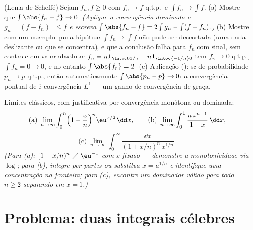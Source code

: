 \begin{exercise}[$\star\star$]\label{exo:b3:lebesgue:11}
(Lema de Scheffé) Sejam $f_n, f \geq 0$  com $f_n \to f$ q.t.p.\ e $\int f_n \to \int f$.
(a) Mostre que $\int\abs{f_n - f} \to 0$. \emph{(Aplique a convergência dominada a $g_n = (f - f_n)^+ \leq f$ e
escreva $\int\abs{f_n - f} = 2\int g_n - \int(f - f_n)$.)}
(b) Mostre com um exemplo que a hipótese $\int f_n \to \int
f$ não pode ser descartada
(uma onda deslizante ou que se concentra), e que a conclusão falha para
$f_n$ com sinal, sem controle em valor absoluto: $f_n = n\mathbf 1_{\intoc0{1/n}} -
n\mathbf 1_{\intoc{-1/n}0}$ tem $f_n \to 0$
q.t.p., $\int f_n
= 0 \to 0$, e no entanto $\int\abs{f_n} = 2$.
(c) Aplicação (): se  de probabilidade $p_n
\to p$
q.t.p., então automaticamente $\int\abs{p_n - p} \to 0$: a convergência pontual de
 é convergência $L^1$ --- um ganho de convergência de
graça.
\end{exercise}

\begin{exercise}[$\star\star$]\label{exo:b3:lebesgue:12}
Limites clássicos, com justificativa  por convergência monótona
ou dominada:
\[
\text{(a)}\ \lim_{n\to\infty}\int_0^n\Bigl(1 -
\frac xn\Bigr)^n\eu^{x/2}\,\dd x, \qquad
\text{(b)}\ \lim_{n\to\infty}\int_0^1\frac{n\,x^{n-1}}{1 +
x}\,\dd x,
\]
\[
\text{(c)}\ \lim_{n\to\infty}\int_0^\infty
\frac{\dd x}{(1 + x/n)^n\,x^{1/n}} .
\]
\emph{(Para (a): $(1 - x/n)^n \nearrow \eu^{-x}$ com $x$ fixado --- demonstre a monotonicidade
via $\log$; para (b), integre por partes ou substitua $x = u^{1/n}$ e
identifique uma concentração na fronteira; para (c), encontre um
dominador  válido para todo $n \geq 2$ separando em $x =
1$.)}
\end{exercise}

\section{Problema: duas integrais célebres}

